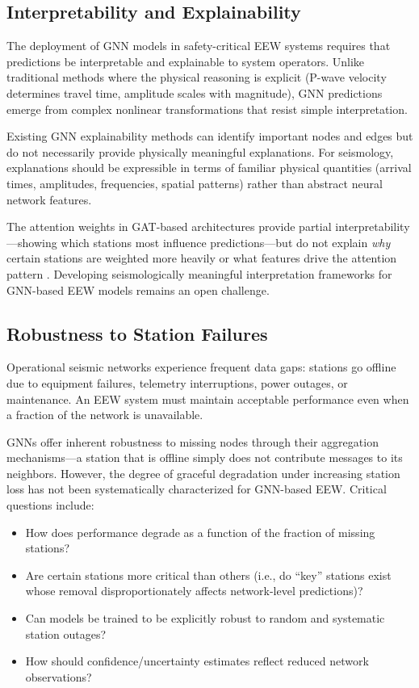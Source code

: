 \documentclass[review,authoryear]{elsarticle}
\begin{document}
\subsection{Interpretability and Explainability}

The deployment of GNN models in safety-critical EEW systems requires that predictions be interpretable and explainable to system operators. Unlike traditional methods where the physical reasoning is explicit (P-wave velocity determines travel time, amplitude scales with magnitude), GNN predictions emerge from complex nonlinear transformations that resist simple interpretation.

Existing GNN explainability methods \citep{ying2019gnnexplainer, lundberg2017unified} can identify important nodes and edges but do not necessarily provide physically meaningful explanations. For seismology, explanations should be expressible in terms of familiar physical quantities (arrival times, amplitudes, frequencies, spatial patterns) rather than abstract neural network features.

The attention weights in GAT-based architectures provide partial interpretability---showing which stations most influence predictions---but do not explain \textit{why} certain stations are weighted more heavily or what features drive the attention pattern \citep{samek2021explaining}. Developing seismologically meaningful interpretation frameworks for GNN-based EEW models remains an open challenge.

\subsection{Robustness to Station Failures}

Operational seismic networks experience frequent data gaps: stations go offline due to equipment failures, telemetry interruptions, power outages, or maintenance. An EEW system must maintain acceptable performance even when a fraction of the network is unavailable.

GNNs offer inherent robustness to missing nodes through their aggregation mechanisms---a station that is offline simply does not contribute messages to its neighbors. However, the degree of graceful degradation under increasing station loss has not been systematically characterized for GNN-based EEW. Critical questions include:

\begin{itemize}
  \item How does performance degrade as a function of the fraction of missing stations?
  \item Are certain stations more critical than others (i.e., do ``key'' stations exist whose removal disproportionately affects network-level predictions)?
  \item Can models be trained to be explicitly robust to random and systematic station outages?
  \item How should confidence/uncertainty estimates reflect reduced network observations?
\end{itemize}
\end{document}
